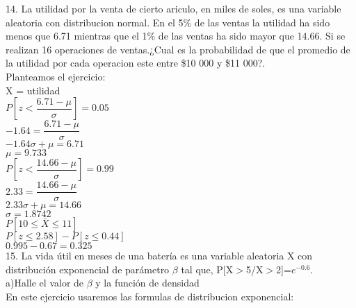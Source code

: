 \documentclass[12 pt,letterpaper]{article}
\begin{document}
\hspace{-0.7cm}14. La utilidad por la venta de cierto ariculo, en miles de soles, es una variable aleatoria con distribucion normal. En el 5\% de las ventas la utilidad ha sido menos que 6.71 mientras que el 1\% de las ventas ha sido mayor que 14.66. Si se realizan 16 operaciones de ventas.¿Cual es la probabilidad de que el promedio de la utilidad por cada operacion este entre \$10 000 y \$11 000?.\\[2ex]

\hspace{-0.7cm}Planteamos el ejercicio:\\[2ex]

\hspace{-0.7cm}X = utilidad\\[1ex]

\hspace{-0.7cm}$P[z < \dfrac{6.71 - \mu}{\sigma}] = 0.05$\\[1ex]
$-1.64 = \dfrac{6.71-\mu}{\sigma}$\\[1ex]
$-1.64\sigma + \mu = 6.71$\\[1ex]
$\mu = 9.733$\\[1ex]

\hspace{-0.7cm}$P[z < \dfrac{14.66 - \mu}{\sigma}] = 0.99$\\[1ex]
$2.33 = \dfrac{14.66-\mu}{\sigma}$\\[1ex]
$2.33\sigma + \mu = 14.66$\\[1ex]
$\sigma = 1.8742$\\[1ex]

\hspace{-0.7cm}$P[10 \leq  \bar{X} \leq 11]$\\[1ex]
$P[z \leq  2.58] - P[z \leq  0.44]$\\[1ex]
$0.995 - 0.67 = 0.325$\\[15ex]

\hspace{-0.7cm}15. La vida útil en meses de una batería es una variable aleatoria X con distribución exponencial de parámetro $\beta$ tal que, P[X$>$5/X$>$2]=$e^{-0.6}$.\\[2ex]

a)Halle el valor de $\beta$ y la función de densidad\\[2ex]

\hspace{-0.7cm}En este ejercicio usaremos las formulas de distribucion exponencial:\\[2ex]
\end{document}
